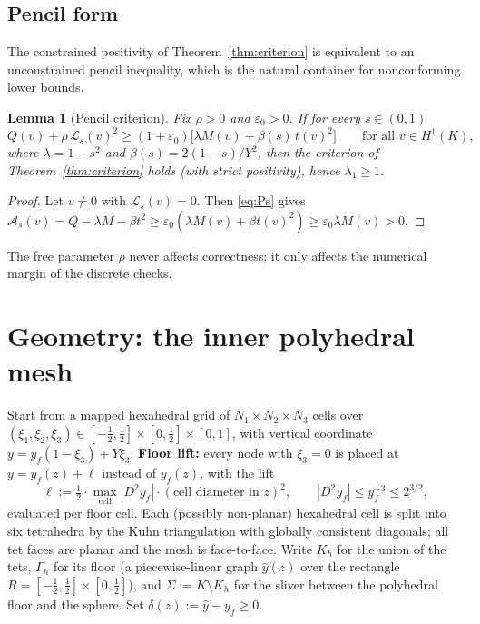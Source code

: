 \documentclass[11pt]{amsart}
\newtheorem{lemma}[theorem]{Lemma}
\begin{document}
\subsection{Pencil form}

The constrained positivity of Theorem~\ref{thm:criterion} is equivalent
to an unconstrained pencil inequality, which is the natural container for
nonconforming lower bounds.

\begin{lemma}[Pencil criterion]\label{lem:P}
Fix $\rho>0$ and $\varepsilon_0>0$.  If for every $s\in(0,1)$
\begin{equation}\label{eq:Ps}
  Q(v)+\rho\,\mathcal{L}_s(v)^2
  \ge(1+\varepsilon_0)\bigl[\lambda M(v)+\beta(s)\,t(v)^2\bigr]
  \qquad\text{for all $v\in H^1(K)$,}
\end{equation}
where $\lambda=1-s^2$ and $\beta(s)=2(1-s)/Y^2$, then the criterion of
Theorem~\ref{thm:criterion} holds (with strict positivity), hence
$\lambda_1\ge 1$.
\end{lemma}

\begin{proof}
Let $v\neq 0$ with $\mathcal{L}_s(v)=0$.  Then \eqref{eq:Ps} gives
$\mathcal{A}_s(v)=Q-\lambda M-\beta t^2
\ge\varepsilon_0(\lambda M(v)+\beta t(v)^2)\ge\varepsilon_0\lambda M(v)>0$.
\end{proof}

The free parameter $\rho$ never affects correctness; it only affects the
numerical margin of the discrete checks.

\section{Geometry: the inner polyhedral mesh}\label{sec:mesh}

Start from a mapped hexahedral grid of $N_1\times N_2\times N_3$ cells over
$(\xi_1,\xi_2,\xi_3)\in[-\tfrac12,\tfrac12]\times[0,\tfrac12]\times[0,1]$,
with vertical coordinate $y=y_f(1-\xi_3)+Y\xi_3$.  \textbf{Floor lift:}
every node with $\xi_3=0$ is placed at $y=y_f(z)+\ell$ instead of $y_f(z)$,
with the lift
\[
  \ell:=\tfrac12\cdot\max_{\mathrm{cell}}|D^2 y_f|\cdot
  (\text{cell diameter in $z$})^2,\qquad
  |D^2 y_f|\le y_f^{-3}\le 2^{3/2},
\]
evaluated per floor cell.  Each (possibly non-planar) hexahedral cell is
split into six tetrahedra by the Kuhn triangulation with globally
consistent diagonals; all tet faces are planar and the mesh is
face-to-face.  Write $K_h$ for the union of the tets, $\Gamma_h$ for its
floor (a piecewise-linear graph $\hat y(z)$ over the rectangle
$R=[-\tfrac12,\tfrac12]\times[0,\tfrac12]$), and
$\Sigma:=K\setminus K_h$ for the sliver between the polyhedral floor and
the sphere.  Set $\delta(z):=\hat y-y_f\ge 0$.
\end{document}
